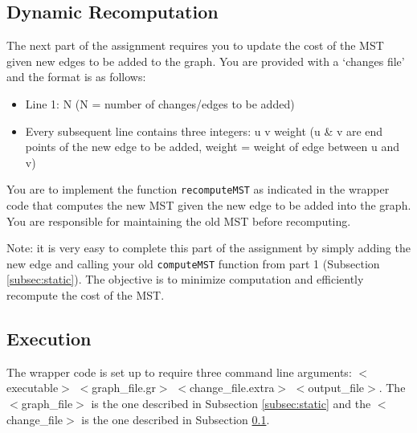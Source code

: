 \documentclass{article}
\begin{document}
\subsection{Dynamic Recomputation}\label{subsec:dynamic}
The next part of the assignment requires you to update the cost of the MST
given new edges to be added to the graph. You are provided with a `changes
file' and the format is as follows:
\begin{itemize}
\item[] Line 1: N (N = number of changes/edges to be added)
\item[] Every subsequent line contains three integers: u v weight (u \& v are
end points of the new edge to be added, weight = weight of edge
between u and v)
\end{itemize} You are to implement the function \texttt{recomputeMST} as
indicated in the wrapper code that computes the new MST given the new edge to
be added into the graph. You are responsible for maintaining the old MST before
recomputing.

Note: it is very easy to complete this part of the assignment by simply adding
the new edge and calling your old \texttt{computeMST} function from part 1
(Subsection \ref{subsec:static}). The objective is to minimize computation and
efficiently recompute the cost of the MST.

\subsection{Execution}\label{subsec:exec} The wrapper code is set up to require
three command line arguments: $<$executable$>$ $<$graph\_file.gr$>$
$<$change\_file.extra$>$ $<$output\_file$>$. The $<$graph\_file$>$ is the one
described in Subsection \ref{subsec:static} and the $<$change\_file$>$ is the
one described in Subsection \ref{subsec:dynamic}.
\end{document}
